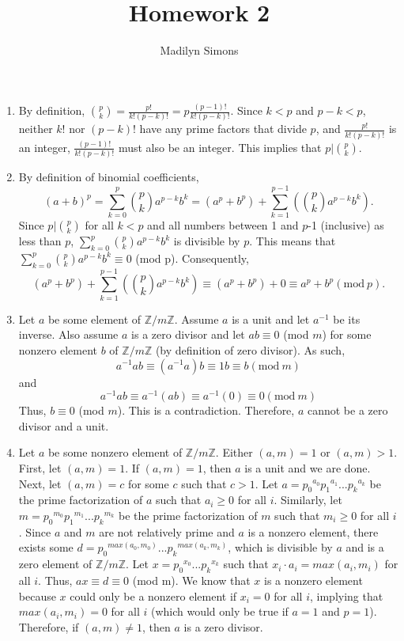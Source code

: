 \documentclass{article}
\title{Homework 2}
\author{Madilyn Simons}
\date{}
\begin{document}
\maketitle

\begin{enumerate}

\item By definition, $\binom{p}{k} = \frac{p!}{k!(p-k)!} = p\frac{(p-1)!}{k!(p-k)!}$.
Since $k < p$ and $p-k < p$, neither $k!$ nor $(p-k)!$ have any prime factors that divide $p$,
and $\frac{p!}{k!(p-k)!}$ is an integer, $\frac{(p-1)!}{k!(p-k)!}$ must also be an integer.
This implies that $p \vert \binom{p}{k}$.

\item By definition of binomial coefficients,
\[
(a+b)^p = \sum_{k=0}^{p} \binom{p}{k} a^{p-k}b^k = (a^p + b^p) +
\sum_{k=1}^{p-1} (\binom{p}{k} a^{p-k}b^k).
\]
Since $p \vert \binom{p}{k}$ for all $k < p$ and all numbers between 1 and $p$-1
(inclusive) as less than $p$, $\sum_{k=0}^{p} \binom{p}{k} a^{p-k}b^k$ is divisible
by $p$.  This means that $\sum_{k=0}^{p} \binom{p}{k} a^{p-k}b^k \equiv 0$ (mod p).
Consequently,
\[
(a^p + b^p) + \sum_{k=1}^{p-1} (\binom{p}{k} a^{p-k}b^k) \equiv (a^p + b^p) + 0
\equiv a^p + b ^p (\textrm{mod}\ p).
\]

\item Let $a$ be some element of $\mathbb{Z}/m\mathbb{Z}$.  Assume $a$ is a unit
and let $a^{-1}$ be its inverse.  Also assume $a$ is a zero divisor and let
$ab \equiv 0$ (mod $m$) for some nonzero element $b$ of $\mathbb{Z}/m\mathbb{Z}$
(by definition of zero divisor).
As such,
\[
a^{-1}ab \equiv (a^{-1}a)b \equiv 1b \equiv b (\textrm{mod}\ m)
\]
and
\[
a^{-1}ab \equiv a^{-1}(ab) \equiv a^{-1}(0) \equiv 0 (\textrm{mod}\ m)
\]
Thus, $b \equiv 0$ (mod $m$).  This is a contradiction.  Therefore, $a$ cannot
be a zero divisor and a unit.

\item Let $a$ be some nonzero element of $\mathbb{Z}/m\mathbb{Z}$.  Either $(a,m) = 1$
or $(a,m) > 1$.  First, let $(a,m) = 1$.  If $(a,m) = 1$, then $a$ is a unit
and we are done.  Next, let $(a, m) = c$ for some $c$ such that $c > 1$.
Let $a = {p_0}^{a_0}{p_1}^{a_1} ... {p_k}^{a_k}$ be the prime factorization of
$a$ such that $a_i \geq 0$ for all $i$.
Similarly, let $m = {p_0}^{m_0}{p_1}^{m_1} ... {p_k}^{m_k}$ be the prime factorization of
$m$ such that $m_i \geq 0$ for all $i$.
Since $a$ and $m$ are not relatively prime and $a$ is a nonzero element, there exists
some $d = {p_0}^{max(a_0, m_0)} ... {p_k}^{max(a_k, m_k)}$, which is divisible by $a$
and is a zero element of $\mathbb{Z}/m\mathbb{Z}$.
Let $x = {p_0}^{x_0} ... {p_k}^{x_k}$ such that $x_i \cdot a_i = max(a_i, m_i)$
for all $i$.  Thus, $ax \equiv d \equiv 0$ (mod m).  We know that $x$ is a nonzero
element because $x$ could only be a nonzero element if $x_i = 0$ for all $i$,
implying that $max(a_i, m_i) = 0$ for all $i$ (which would only be true if $a = 1$ and
$p = 1$).  Therefore, if $(a, m) \neq 1$, then $a$ is a zero divisor.



\end{enumerate}
\end{document}
